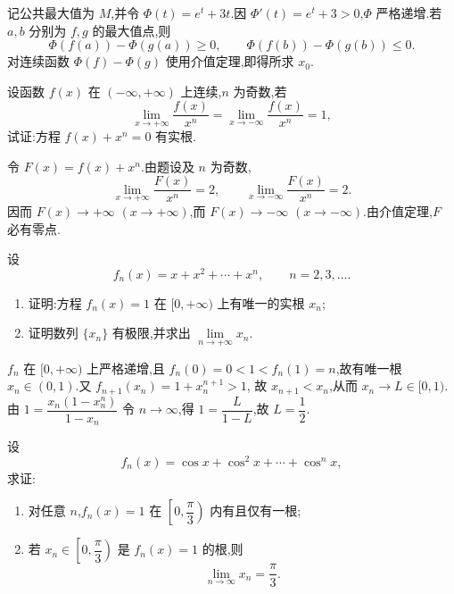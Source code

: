 \begin{solution}
    记公共最大值为 $M$,并令 $\Phi(t)=e^t+3t$.因 $\Phi'(t)=e^t+3>0$,$\Phi$ 严格递增.若 $a,b$ 分别为 $f,g$ 的最大值点,则
    \[
        \Phi(f(a))-\Phi(g(a))\geq0, \qquad \Phi(f(b))-\Phi(g(b))\leq0.
    \]
    对连续函数 $\Phi(f)-\Phi(g)$ 使用介值定理,即得所求 $x_0$.
\end{solution}

\begin{example}
    设函数 $f(x)$ 在 $(-\infty,+\infty)$ 上连续,$n$ 为奇数,若
    \[
        \displaystyle\lim\limits_{x\to+\infty}\dfrac{f(x)}{x^n}
        =\lim\limits_{x\to-\infty}\dfrac{f(x)}{x^n}=1,
    \]
    试证:方程 $f(x)+x^n=0$ 有实根.
\end{example}
\exampleblank

\begin{solution}
    令 $F(x)=f(x)+x^n$.由题设及 $n$ 为奇数,
    \[
        \displaystyle\lim\limits_{x\to+\infty}\dfrac{F(x)}{x^n}=2,
        \qquad
        \lim\limits_{x\to-\infty}\dfrac{F(x)}{x^n}=2.
    \]
    因而 $F(x)\to+\infty$ $(x\to+\infty)$,而 $F(x)\to-\infty$ $(x\to-\infty)$.由介值定理,$F$ 必有零点.
\end{solution}

\begin{example}
    设
    \[
        f_n(x)=x+x^2+\cdots+x^n, \qquad n=2,3,\ldots.
    \]
    \begin{enumerate}
        \item 证明:方程 $f_n(x)=1$ 在 $\lbrack 0,+\infty)$ 上有唯一的实根 $x_n$;
        \item 证明数列 $\{x_n\}$ 有极限,并求出 $\displaystyle\lim\limits_{n\to+\infty}x_n$.
    \end{enumerate}
\end{example}
\exampleblank

\begin{solution}
    $f_n$ 在 $\lbrack0,+\infty)$ 上严格递增,且 $f_n(0)=0<1<f_n(1)=n$,故有唯一根 $x_n\in(0,1)$.又 $f_{n+1}(x_n)=1+x_n^{n+1}>1$,
    故 $x_{n+1}<x_n$,从而 $x_n\to L\in\lbrack0,1)$.由 $1=\dfrac{x_n(1-x_n^n)}{1-x_n}$
    令 $n\to\infty$,得 $1=\dfrac{L}{1-L}$,故 $L=\dfrac{1}{2}$.
\end{solution}

\begin{example}
    设
    \[
        f_n(x)=\cos x+\cos^2x+\cdots+\cos^n x,
    \]
    求证:
    \begin{enumerate}
        \item 对任意 $n$,$f_n(x)=1$ 在 $\left[0,\dfrac{\pi}{3}\right)$ 内有且仅有一根;
        \item 若 $x_n\in\left[0,\dfrac{\pi}{3}\right)$ 是 $f_n(x)=1$ 的根,则
              \[
                  \displaystyle\lim\limits_{n\to\infty}x_n=\dfrac{\pi}{3}.
              \]
    \end{enumerate}
\end{example}
\exampleblank

